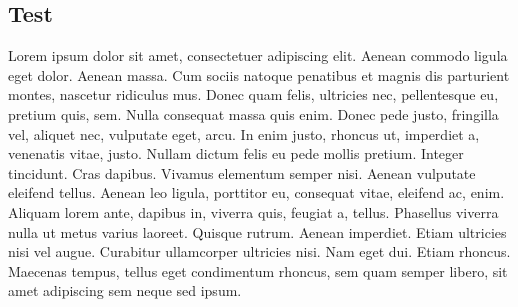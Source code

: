 \begin{apendicesenv}
      
    \partapendices

    \setcounter{chapter}{0}
    \renewcommand{\thechapter}{\Alph{chapter}}%

    \chapter{Test}

    Lorem ipsum dolor sit amet, consectetuer adipiscing 
    elit. Aenean commodo ligula eget dolor. Aenean massa.
    Cum sociis natoque penatibus et magnis dis parturient
    montes, nascetur ridiculus mus. Donec quam felis, 
    ultricies nec, pellentesque eu, pretium quis, sem. 
    Nulla consequat massa quis enim. Donec pede justo, 
    fringilla vel, aliquet nec, vulputate eget, arcu. In 
    enim justo, rhoncus ut, imperdiet a, venenatis vitae,
    justo. Nullam dictum felis eu pede mollis pretium. 
    Integer tincidunt. Cras dapibus. Vivamus elementum 
    semper nisi. Aenean vulputate eleifend tellus. Aenean 
    leo ligula, porttitor eu, consequat vitae, eleifend 
    ac, enim. Aliquam lorem ante, dapibus in, viverra 
    quis, feugiat a, tellus. Phasellus viverra nulla ut 
    metus varius laoreet. Quisque rutrum. Aenean imperdiet.
    Etiam ultricies nisi vel augue. Curabitur ullamcorper 
    ultricies nisi. Nam eget dui. Etiam rhoncus. Maecenas 
    tempus, tellus eget condimentum rhoncus, sem quam 
    semper libero, sit amet adipiscing sem neque sed ipsum.

\end{apendicesenv}